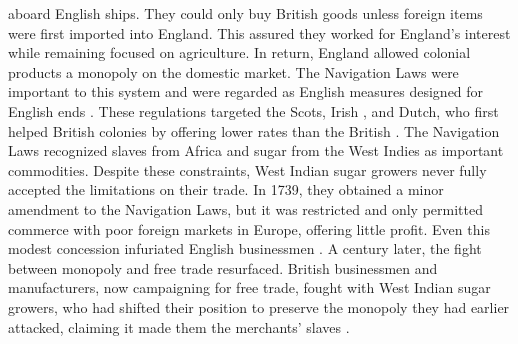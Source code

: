 aboard English ships. They could only buy British goods unless foreign items were first imported into England. This assured they worked for England's interest while remaining focused on agriculture. In return, England allowed colonial products a monopoly on the domestic market. The Navigation Laws were important to this system and were regarded as English measures designed for English ends . These regulations targeted the Scots, Irish , and Dutch, who first helped British colonies by offering lower rates than the British . The Navigation Laws recognized slaves from Africa and sugar from the West Indies as important commodities. Despite these constraints, West Indian sugar growers never fully accepted the limitations on their trade. In 1739, they obtained a minor amendment to the Navigation Laws, but it was restricted and only permitted commerce with poor foreign markets in Europe, offering little profit. Even this modest concession infuriated English businessmen . A century later, the fight between monopoly and free trade resurfaced. British businessmen and manufacturers, now campaigning for free trade, fought with West Indian sugar growers, who had shifted their position to preserve the monopoly they had earlier attacked, claiming it made them the merchants' slaves .
